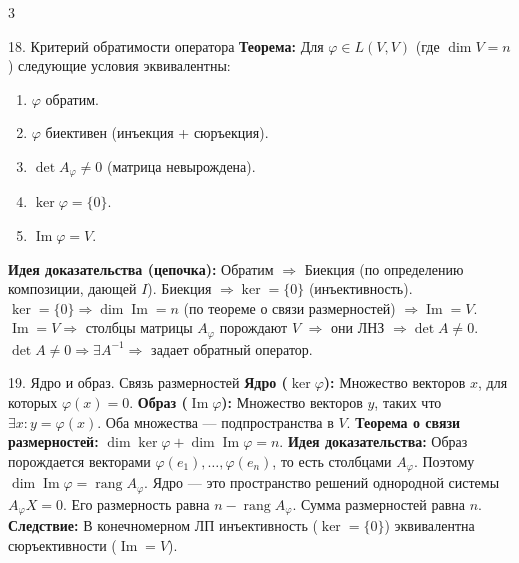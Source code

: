 \documentclass[8pt, a4paper, landscape]{extarticle}
\newcommand{\Ra}{\Rightarrow}
\begin{document}
\begin{multicols*}{3}
\begin{ticket}{18. Критерий обратимости оператора}
\textbf{Теорема:} Для $\varphi \in L(V, V)$ (где $\dim V = n$) следующие условия эквивалентны:
\begin{enumerate}
    \item $\varphi$ обратим.
    \item $\varphi$ биективен (инъекция + сюръекция).
    \item $\det A_\varphi \neq 0$ (матрица невырождена).
    \item $\ker \varphi = \{0\}$.
    \item $\operatorname{Im} \varphi = V$.
\end{enumerate}
\tcblower
\textbf{Идея доказательства (цепочка):} 
Обратим $\Ra$ Биекция (по определению композиции, дающей $I$). 
Биекция $\Ra \ker=\{0\}$ (инъективность). 
$\ker=\{0\} \Ra \dim \operatorname{Im} = n$ (по теореме о связи размерностей) $\Ra \operatorname{Im}=V$. 
$\operatorname{Im}=V \Ra$ столбцы матрицы $A_\varphi$ порождают $V$ $\Ra$ они ЛНЗ $\Ra \det A \neq 0$. 
$\det A \neq 0 \Ra \exists A^{-1} \Ra$ задает обратный оператор.
\end{ticket}

\begin{ticket}{19. Ядро и образ. Связь размерностей}
\textbf{Ядро ($\ker \varphi$):} Множество векторов $x$, для которых $\varphi(x) = 0$.
\textbf{Образ ($\operatorname{Im} \varphi$):} Множество векторов $y$, таких что $\exists x : y = \varphi(x)$. 
Оба множества --- подпространства в $V$.
\textbf{Теорема о связи размерностей:} $\dim \ker \varphi + \dim \operatorname{Im} \varphi = n$.
\tcblower
\textbf{Идея доказательства:} 
Образ порождается векторами $\varphi(e_1), \dots, \varphi(e_n)$, то есть столбцами $A_\varphi$. Поэтому $\dim \operatorname{Im} \varphi = \operatorname{rang} A_\varphi$.
Ядро --- это пространство решений однородной системы $A_\varphi X = 0$. Его размерность равна $n - \operatorname{rang} A_\varphi$. 
Сумма размерностей равна $n$.
\textbf{Следствие:} В конечномерном ЛП инъективность ($\ker=\{0\}$) эквивалентна сюръективности ($\operatorname{Im}=V$).
\end{ticket}


\end{multicols*}
\end{document}
